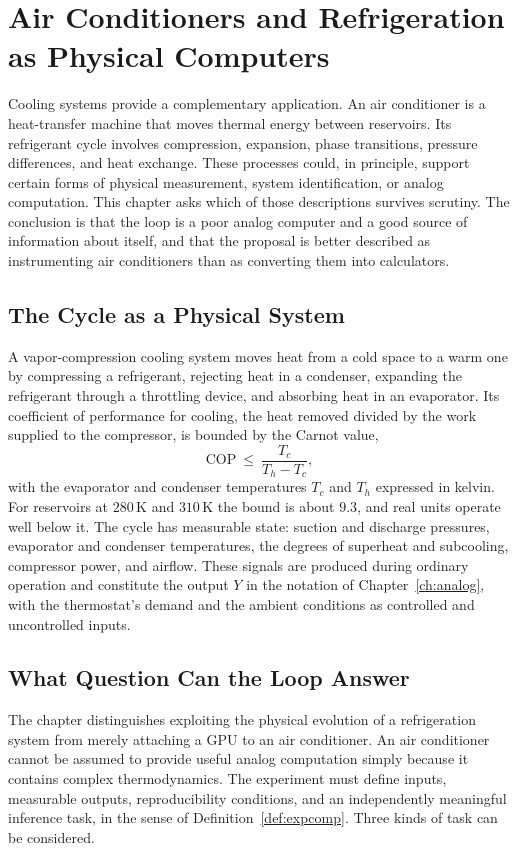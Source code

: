 \chapter[Refrigeration as Physical Computers]{Air Conditioners and Refrigeration as Physical Computers}
\label{ch:refrigeration}

Cooling systems provide a complementary application. An air conditioner is a heat-transfer machine that moves thermal energy between reservoirs. Its refrigerant cycle involves compression, expansion, phase transitions, pressure differences, and heat exchange. These processes could, in principle, support certain forms of physical measurement, system identification, or analog computation. This chapter asks which of those descriptions survives scrutiny. The conclusion is that the loop is a poor analog computer and a good source of information about itself, and that the proposal is better described as instrumenting air conditioners than as converting them into calculators.

\section{The Cycle as a Physical System}

A vapor-compression cooling system moves heat from a cold space to a warm one by compressing a refrigerant, rejecting heat in a condenser, expanding the refrigerant through a throttling device, and absorbing heat in an evaporator. Its coefficient of performance for cooling, the heat removed divided by the work supplied to the compressor, is bounded by the Carnot value,
\[
\mathrm{COP}\ \le\ \frac{T_c}{T_h-T_c},
\]
with the evaporator and condenser temperatures $T_c$ and $T_h$ expressed in kelvin. For reservoirs at $280\,\mathrm{K}$ and $310\,\mathrm{K}$ the bound is about $9.3$, and real units operate well below it. The cycle has measurable state: suction and discharge pressures, evaporator and condenser temperatures, the degrees of superheat and subcooling, compressor power, and airflow. These signals are produced during ordinary operation and constitute the output $Y$ in the notation of Chapter~\ref{ch:analog}, with the thermostat's demand and the ambient conditions as controlled and uncontrolled inputs.

\section{What Question Can the Loop Answer}

The chapter distinguishes exploiting the physical evolution of a refrigeration system from merely attaching a GPU to an air conditioner. An air conditioner cannot be assumed to provide useful analog computation simply because it contains complex thermodynamics. The experiment must define inputs, measurable outputs, reproducibility conditions, and an independently meaningful inference task, in the sense of Definition~\ref{def:expcomp}. Three kinds of task can be considered.

